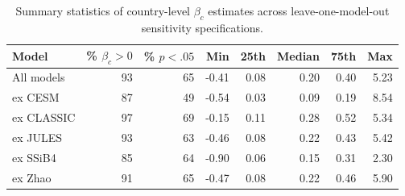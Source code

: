 \begin{table}[ht]
\centering
\caption{Summary statistics of country-level $\beta_c$ estimates across leave-one-model-out sensitivity specifications.} 
\label{tab:beta_summary}
\begin{tabular}{lrrrrrrr}
  \toprule
Model & \% $\beta_c > 0$ & \% $p < .05$ & Min & 25th & Median & 75th & Max \\ 
  \midrule
All models & 93 & 65 & -0.41 & 0.08 & 0.20 & 0.40 & 5.23 \\ 
  ex CESM & 87 & 49 & -0.54 & 0.03 & 0.09 & 0.19 & 8.54 \\ 
  ex CLASSIC & 97 & 69 & -0.15 & 0.11 & 0.28 & 0.52 & 5.34 \\ 
  ex JULES & 93 & 63 & -0.46 & 0.08 & 0.22 & 0.43 & 5.42 \\ 
  ex SSiB4 & 85 & 64 & -0.90 & 0.06 & 0.15 & 0.31 & 2.30 \\ 
  ex Zhao & 91 & 65 & -0.47 & 0.08 & 0.22 & 0.46 & 5.90 \\ 
   \bottomrule
\end{tabular}
\end{table}
